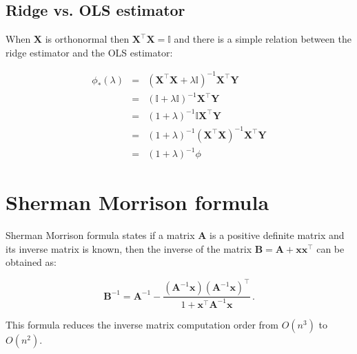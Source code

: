 
\appendix



\subsection{Ridge vs. OLS estimator}
When $\mathbf{X}$ is orthonormal then $\mathbf{X}^\intercal \mathbf{X} =\mathbb{I}$ and there is a simple relation between the ridge estimator and the OLS estimator:

\begin{eqnarray*}
\phi_* (\lambda) &=& (\mathbf{X}^\intercal \mathbf{X}+\lambda \mathbb{I})^{-1}\mathbf{X}^\intercal \mathbf{Y} \\
 &=& (\mathbb{I} + \lambda \mathbb{I})^{-1} \mathbf{X}^\intercal \mathbf{Y} \\
 &=&(1+\lambda)^{-1} \mathbb{I} \mathbf{X}^\intercal \mathbf{Y} \\
 &=&(1+\lambda)^{-1} (\mathbf{X}^\intercal \mathbf{X})^{-1}\mathbf{X}^\intercal \mathbf{Y} \\
 &=&(1+\lambda)^{-1} \phi
\end{eqnarray*}










\section{Sherman Morrison formula} \label{sec:sherman}

Sherman Morrison formula states if a matrix $\mathbf{A}$ is a positive
definite matrix and its inverse matrix is known, then the inverse of the
matrix $\mathbf{B}=\mathbf{A} + \mathbf{x}\mathbf{x}^\intercal$ can be
obtained as: 

\begin{equation*}
\mathbf{B}^{-1} = \mathbf{A}^{-1} -
\frac{(\mathbf{A}^{-1}\mathbf{x})(\mathbf{A}^{-1}\mathbf{x})^{\intercal}}
{1 + \mathbf{x}^{\intercal} \mathbf{A}^{-1} \mathbf{x}} \, .
\end{equation*}

This formula reduces the inverse matrix computation order from $O(n^3)$ to
$O(n^2)$.
